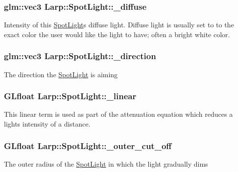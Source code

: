 \subsubsection[{\texorpdfstring{\+\_\+diffuse}{_diffuse}}]{\setlength{\rightskip}{0pt plus 5cm}glm\+::vec3 Larp\+::\+Spot\+Light\+::\+\_\+diffuse}\hypertarget{structLarp_1_1SpotLight_a3709b2d7039822a74a40e127e78a2638}{}\label{structLarp_1_1SpotLight_a3709b2d7039822a74a40e127e78a2638}
Intensity of this \hyperlink{structLarp_1_1SpotLight}{Spot\+Light}\textquotesingle{}s diffuse light. Diffuse light is usually set to to the exact color the user would like the light to have; often a bright white color. 
\subsubsection[{\texorpdfstring{\+\_\+direction}{_direction}}]{\setlength{\rightskip}{0pt plus 5cm}glm\+::vec3 Larp\+::\+Spot\+Light\+::\+\_\+direction}\hypertarget{structLarp_1_1SpotLight_a379727dc7064b4ed966d3615c1f62e96}{}\label{structLarp_1_1SpotLight_a379727dc7064b4ed966d3615c1f62e96}
The direction the \hyperlink{structLarp_1_1SpotLight}{Spot\+Light} is aiming 
\subsubsection[{\texorpdfstring{\+\_\+linear}{_linear}}]{\setlength{\rightskip}{0pt plus 5cm}G\+Lfloat Larp\+::\+Spot\+Light\+::\+\_\+linear}\hypertarget{structLarp_1_1SpotLight_a3375fb81ee2259e94e64c28832cc5d74}{}\label{structLarp_1_1SpotLight_a3375fb81ee2259e94e64c28832cc5d74}
This linear term is used as part of the attenuation equation which reduces a light\textquotesingle{}s intensity of a distance. 
\subsubsection[{\texorpdfstring{\+\_\+outer\+\_\+cut\+\_\+off}{_outer_cut_off}}]{\setlength{\rightskip}{0pt plus 5cm}G\+Lfloat Larp\+::\+Spot\+Light\+::\+\_\+outer\+\_\+cut\+\_\+off}\hypertarget{structLarp_1_1SpotLight_af0693fecc521fa61ce5227d4d9b39ac2}{}\label{structLarp_1_1SpotLight_af0693fecc521fa61ce5227d4d9b39ac2}
The outer radius of the \hyperlink{structLarp_1_1SpotLight}{Spot\+Light} in which the light gradually dims 
